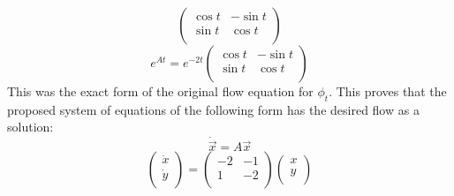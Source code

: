 \documentclass[12pt,letterpaper,reqno]{amsart}
\begin{document}
\begin{enumerate}
\begin{enumerate}
\begin{flushleft}
$$\begin{pmatrix}
  \cos{t} & -\sin{t} \\
  \sin{t} & \cos{t} \\
\end{pmatrix}$$
$$e^{At} = e^{-2t}\begin{pmatrix}
  \cos{t} & -\sin{t} \\
  \sin{t} & \cos{t} \\
\end{pmatrix}$$
This was the exact form of the original flow equation for $\phi_t$. This proves that the proposed system of equations of the following form has the desired flow as a solution:
$$\dot{\vec{x}} = A\vec{x}$$
  $$\begin{pmatrix}
  \dot{x} \\
  \dot{y} \\
\end{pmatrix} =
\begin{pmatrix}
  -2 & -1 \\
  1 & -2 \\
\end{pmatrix}
\begin{pmatrix}
  x \\
  y \\
\end{pmatrix}$$
  \end{flushleft}

\end{enumerate}

\end{enumerate}
\end{document}
